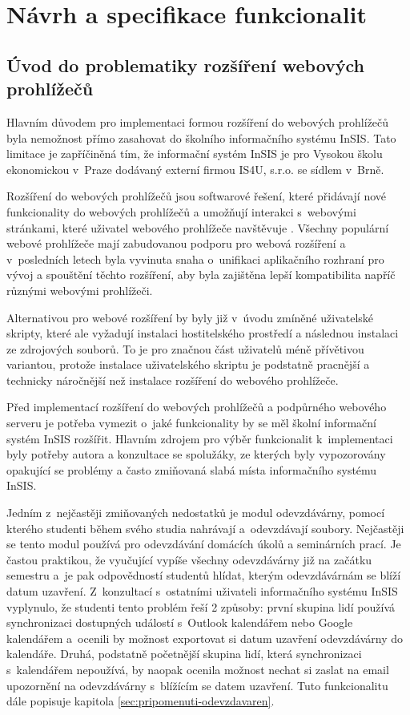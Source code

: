 \chapter{Návrh a specifikace funkcionalit}\label{chap:navrh-a-specifikace}


\section{Úvod do problematiky rozšíření webových prohlížečů}

Hlavním důvodem pro implementaci formou rozšíření do webových prohlížečů byla nemožnost přímo zasahovat do školního informačního systému InSIS. Tato limitace je zapříčiněná tím, že informační systém InSIS je  pro Vysokou školu ekonomickou v~Praze dodávaný externí firmou IS4U, s.r.o. se sídlem v~Brně. 

Rozšíření do webových prohlížečů jsou softwarové řešení, které přidávají nové funkcionality do webových prohlížečů a umožňují interakci s~webovými stránkami, které uživatel webového prohlížeče navštěvuje \cite{web_extensions_2019}. Všechny populární webové prohlížeče mají zabudovanou podporu pro webová rozšíření a v~posledních letech byla vyvinuta snaha o~unifikaci aplikačního rozhraní pro vývoj a spouštění těchto rozšíření, aby byla zajištěna lepší kompatibilita napříč různými webovými prohlížeči.  

Alternativou pro webové rozšíření by byly již v~úvodu zmíněné uživatelské skripty, které ale vyžadují instalaci hostitelského prostředí a následnou instalaci ze zdrojových souborů. To je pro značnou část uživatelů méně přívětivou variantou, protože instalace uživatelského skriptu je podstatně pracnější a technicky náročnější než instalace rozšíření do webového prohlížeče. 

Před implementací rozšíření do webových prohlížečů a podpůrného webového serveru je potřeba vymezit o~jaké funkcionality by se měl školní informační systém InSIS rozšířit. 
Hlavním zdrojem pro výběr funkcionalit k~implementaci byly potřeby autora a konzultace se spolužáky, ze kterých byly vypozorovány opakující se problémy a často zmiňovaná slabá místa informačního systému InSIS. 

Jedním z~nejčastěji zmiňovaných nedostatků je modul odevzdávárny, pomocí kterého studenti během svého studia nahrávají a~odevzdávají soubory. Nejčastěji se tento modul používá pro odevzdávání domácích úkolů a seminárních prací. Je častou praktikou, že vyučující vypíše všechny odevzdávárny již na začátku semestru a~je pak odpovědností studentů hlídat, kterým odevzdávárnám se blíží datum uzavření. Z~konzultací s~ostatními uživateli informačního systému InSIS vyplynulo, že studenti tento problém řeší 2 způsoby: první skupina lidí používá synchronizaci dostupných událostí s~Outlook kalendářem nebo Google kalendářem a~ocenili by možnost exportovat si datum uzavření odevzdávárny do kalendáře. Druhá, podstatně početnější skupina lidí, která synchronizaci s~kalendářem nepoužívá, by naopak ocenila možnost nechat si zaslat na email upozornění na odevzdávárny s~blížícím se datem uzavření. Tuto funkcionalitu dále popisuje kapitola \ref{sec:pripomenuti-odevzdavaren}.

